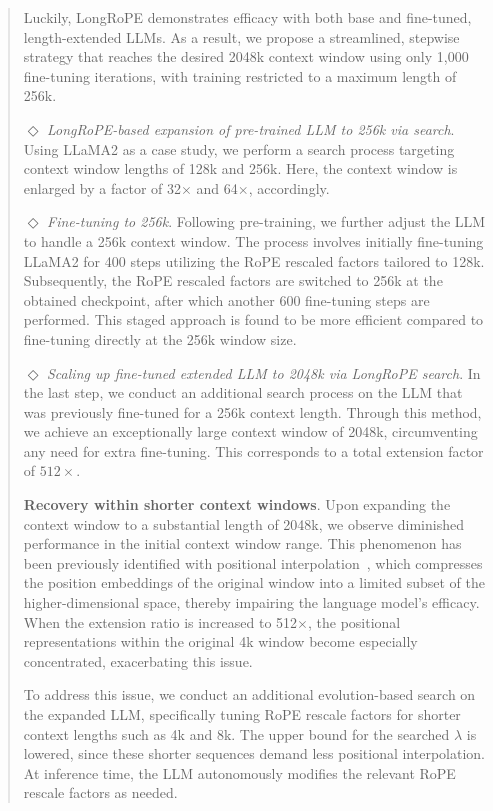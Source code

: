 \begin{abstract}
Luckily, LongRoPE demonstrates efficacy with both base and fine-tuned, length-extended LLMs. As a result, we propose a streamlined, stepwise strategy that reaches the desired 2048k context window using only 1,000 fine-tuning iterations, with training restricted to a maximum length of 256k.

$\Diamond$ \textit{LongRoPE-based expansion of pre-trained LLM to 256k via search}. Using LLaMA2 as a case study, we perform a search process targeting context window lengths of 128k and 256k. Here, the context window is enlarged by a factor of 32$\times$ and 64$\times$, accordingly.

$\Diamond$ \textit{Fine-tuning to 256k}. Following pre-training, we further adjust the LLM to handle a 256k context window. The process involves initially fine-tuning LLaMA2 for 400 steps utilizing the RoPE rescaled factors tailored to 128k. Subsequently, the RoPE rescaled factors are switched to 256k at the obtained checkpoint, after which another 600 fine-tuning steps are performed. This staged approach is found to be more efficient compared to fine-tuning directly at the 256k window size.

$\Diamond$ \textit{Scaling up fine-tuned extended LLM to 2048k via LongRoPE search}. In the last step, we conduct an additional search process on the LLM that was previously fine-tuned for a 256k context length. Through this method, we achieve an exceptionally large context window of 2048k, circumventing any need for extra fine-tuning. This corresponds to a total extension factor of $512\times$.

\textbf{Recovery within shorter context windows}. Upon expanding the context window to a substantial length of 2048k, we observe diminished performance in the initial context window range. This phenomenon has been previously identified with positional interpolation~\cite{pi}, which compresses the position embeddings of the original window into a limited subset of the higher-dimensional space, thereby impairing the language model’s efficacy. When the extension ratio is increased to 512$\times$, the positional representations within the original 4k window become especially concentrated, exacerbating this issue.

To address this issue, we conduct an additional evolution-based search on the expanded LLM, specifically tuning RoPE rescale factors for shorter context lengths such as 4k and 8k. The upper bound for the searched $\lambda$ is lowered, since these shorter sequences demand less positional interpolation. At inference time, the LLM autonomously modifies the relevant RoPE rescale factors as needed.


\end{abstract}
